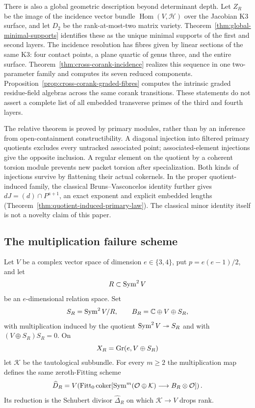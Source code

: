 There is also a global geometric description beyond determinant depth.
Let \(Z_R\) be the image of the incidence vector bundle
\(\operatorname{Hom}(V,\mathcal H)\) over the Jacobian K3 surface,
and let \(D_2\) be the rank-at-most-two matrix variety.
Theorem~\ref{thm:global-minimal-supports} identifies these as the
unique minimal supports of the first and second layers.  The incidence
resolution has fibres given by linear sections of the same K3:
four contact points, a plane quartic of genus three, and the entire
surface.  Theorem~\ref{thm:cross-corank-incidence} realizes this
sequence in one two-parameter family and computes its seven reduced
components.  Proposition~\ref{prop:cross-corank-graded-fibres}
computes the intrinsic graded residue-field algebras across the same
corank transitions.  These statements do not assert a complete list
of all embedded transverse primes of the third and fourth layers.

The relative theorem is proved by primary modules, rather than by an
inference from open-containment constructibility.  A diagonal
injection into filtered primary quotients excludes every untracked
associated point; associated-element injections give the opposite
inclusion.  A regular element on the quotient by a coherent torsion
module prevents new packet torsion after specialization.  Both kinds
of injections survive by flattening their actual cokernels.
In the proper quotient-induced family, the classical
Bruns--Vasconcelos identity \cite{BrunsVasconcelos} further gives
\(dJ=(d)\cap P^{a+1}\), an exact exponent and explicit embedded
lengths (Theorem~\ref{thm:quotient-induced-primary-law}).  The
classical minor identity itself is not a novelty claim of this paper.

\subsection{The multiplication failure scheme}

Let \(V\) be a complex vector space of dimension
\(e\in\{3,4\}\), put \(p=e(e-1)/2\), and let
\[
 R\subset\operatorname{Sym}^2V
\]
be an \(e\)-dimensional relation space.  Set
\[
 S_R=\operatorname{Sym}^2V/R,\qquad
 B_R=\mathbb C\oplus V\oplus S_R,
\]
with multiplication induced by the quotient
\(\operatorname{Sym}^2V\twoheadrightarrow S_R\) and with
\((V\oplus S_R)S_R=0\).  On
\[
 X_R=\operatorname{Gr}(e,V\oplus S_R)
\]
let \(\mathcal K\) be the tautological subbundle.  For every
\(m\ge2\) the multiplication map defines the same zeroth-Fitting
scheme
\begin{equation}\label{eq:failure-intro}
 \widehat D_R=
 V\!\left(
 \operatorname{Fitt}_0\operatorname{coker}[
 \operatorname{Sym}^m(\mathcal O\oplus\mathcal K)\longrightarrow
 B_R\otimes\mathcal O]\right).
\end{equation}
Its reduction is the Schubert divisor
\(\widehat\Delta_R\) on which \(\mathcal K\to V\) drops rank.

